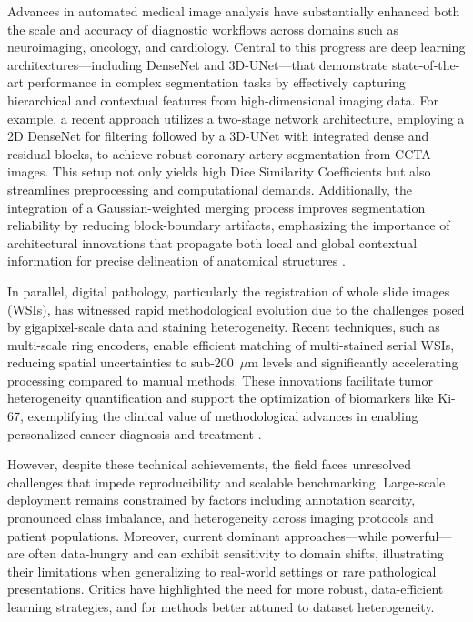 \documentclass[sigconf]{acmart}
\begin{document}
Advances in automated medical image analysis have substantially enhanced both the scale and accuracy of diagnostic workflows across domains such as neuroimaging, oncology, and cardiology. Central to this progress are deep learning architectures—including DenseNet and 3D-UNet—that demonstrate state-of-the-art performance in complex segmentation tasks by effectively capturing hierarchical and contextual features from high-dimensional imaging data. For example, a recent approach utilizes a two-stage network architecture, employing a 2D DenseNet for filtering followed by a 3D-UNet with integrated dense and residual blocks, to achieve robust coronary artery segmentation from CCTA images. This setup not only yields high Dice Similarity Coefficients but also streamlines preprocessing and computational demands. Additionally, the integration of a Gaussian-weighted merging process improves segmentation reliability by reducing block-boundary artifacts, emphasizing the importance of architectural innovations that propagate both local and global contextual information for precise delineation of anatomical structures \cite{ref94,ref100}.

In parallel, digital pathology, particularly the registration of whole slide images (WSIs), has witnessed rapid methodological evolution due to the challenges posed by gigapixel-scale data and staining heterogeneity. Recent techniques, such as multi-scale ring encoders, enable efficient matching of multi-stained serial WSIs, reducing spatial uncertainties to sub-200~$\mu$m levels and significantly accelerating processing compared to manual methods. These innovations facilitate tumor heterogeneity quantification and support the optimization of biomarkers like Ki-67, exemplifying the clinical value of methodological advances in enabling personalized cancer diagnosis and treatment \cite{ref94}.

However, despite these technical achievements, the field faces unresolved challenges that impede reproducibility and scalable benchmarking. Large-scale deployment remains constrained by factors including annotation scarcity, pronounced class imbalance, and heterogeneity across imaging protocols and patient populations. Moreover, current dominant approaches—while powerful—are often data-hungry and can exhibit sensitivity to domain shifts, illustrating their limitations when generalizing to real-world settings or rare pathological presentations. Critics have highlighted the need for more robust, data-efficient learning strategies, and for methods better attuned to dataset heterogeneity.
\end{document}
